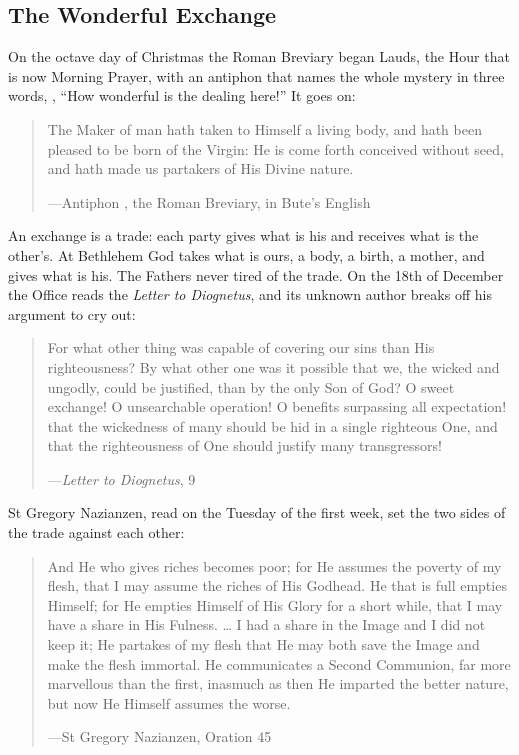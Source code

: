 \subsection{The Wonderful Exchange}\label{sec:exchange}

On the octave day of Christmas the Roman Breviary began Lauds, the Hour that is
now Morning Prayer, with an antiphon that names the whole mystery in three words,
, ``How wonderful is the dealing here!'' It goes
on:

\begin{quote}
The Maker of man hath taken to Himself a living body, and hath been pleased to
be born of the Virgin: He is come forth conceived without seed, and hath made us
partakers of His Divine nature.\par
{\smallskip\noindent\small ---Antiphon , the Roman Breviary, in Bute's English\par}
\end{quote}

\noindent An exchange is a trade: each party gives what is his and receives what
is the other's. At Bethlehem God takes what is ours, a body, a birth, a mother,
and gives what is his. The Fathers never tired of the trade. On the 18th of
December the Office reads the \emph{Letter to Diognetus}, and its unknown
author breaks off his argument to cry out:

\begin{quote}
For what other thing was capable of covering our sins than His righteousness?
By what other one was it possible that we, the wicked and ungodly, could be
justified, than by the only Son of God? O sweet exchange! O unsearchable
operation! O benefits surpassing all expectation! that the wickedness of many
should be hid in a single righteous One, and that the righteousness of One
should justify many transgressors!\par
{\smallskip\noindent\small ---\emph{Letter to Diognetus}, 9\par}
\end{quote}

\noindent St Gregory Nazianzen, read on the Tuesday of the first week, set the
two sides of the trade against each other:

\begin{quote}
And He who gives riches becomes poor; for He assumes the poverty of my flesh,
that I may assume the riches of His Godhead. He that is full empties Himself;
for He empties Himself of His Glory for a short while, that I may have a share
in His Fulness. \ldots{} I had a share in the Image and I did not keep it; He
partakes of my flesh that He may both save the Image and make the flesh
immortal. He communicates a Second Communion, far more marvellous than the
first, inasmuch as then He imparted the better nature, but now He Himself
assumes the worse.\par
{\smallskip\noindent\small ---St Gregory Nazianzen, Oration 45\par}
\end{quote}

